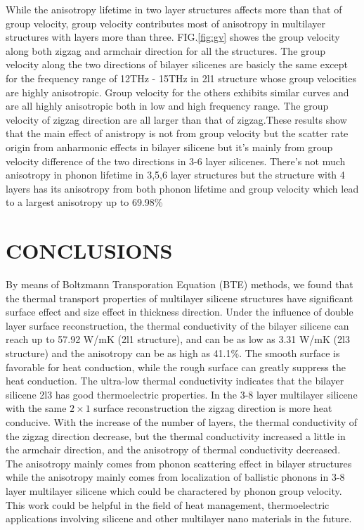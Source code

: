 \documentclass[%
 reprint,
 amsmath,amssymb,
 aps,
 prb,
]{revtex4-1}
\begin{document}
While the anisotropy lifetime in two layer structures affects more than that of group velocity, group velocity contributes most of anisotropy in multilayer structures with layers more than three.  FIG.\ref{fig:gv} showes the group velocity along both zigzag and armchair direction for all the structures. The group velocity  along the two directions of  bilayer silicenes are basicly the same except for the frequency range of 12THz - 15THz in 2l1 structure whose  group velocities are highly anisotropic. Group velocity for the others exhibits similar curves and are all highly anisotropic both in low and high frequency range. The group velocity of zigzag direction are all larger than that of zigzag.These results  show that the main effect of anistropy is not from group velocity but the scatter rate origin from anharmonic effects in bilayer silicene but it's mainly from group velocity difference of the two directions in 3-6 layer silicenes. There's not much anisotropy in phonon lifetime in 3,5,6 layer structures but the structure with 4 layers has its anisotropy from both phonon lifetime and group velocity which lead to a largest anisotropy up to 69.98\%



\section{CONCLUSIONS}

By means of Boltzmann Transporation Equation (BTE) methods, we found that the thermal transport properties of multilayer silicene structures have significant surface effect and size effect in thickness direction. Under the influence of double layer surface reconstruction, the thermal conductivity of the bilayer silicene can reach up to 57.92 W/mK (2l1 structure), and can be as low as 3.31 W/mK (2l3 structure) and the anisotropy can be as high as 41.1\%. The smooth surface is favorable for heat conduction, while the rough surface can greatly suppress the heat conduction. The ultra-low thermal conductivity indicates that the bilayer silicene 2l3 has good thermoelectric properties. In the 3-8 layer multilayer silicene with the same $2 \times 1$ surface reconstruction the zigzag direction is more heat conducive. With the increase of the number of layers, the thermal conductivity of the zigzag direction decrease, but the thermal conductivity increased a little in the armchair direction, and the anisotropy of thermal conductivity decreased. The anisotropy mainly comes from phonon scattering effect in bilayer structures while the anisotropy mainly comes from localization of ballistic phonons in 3-8 layer multilayer silicene which could be charactered by phonon group velocity. This work could be helpful in the field of heat management, thermoelectric applications involving silicene and other multilayer nano materials in the future.
\end{document}
